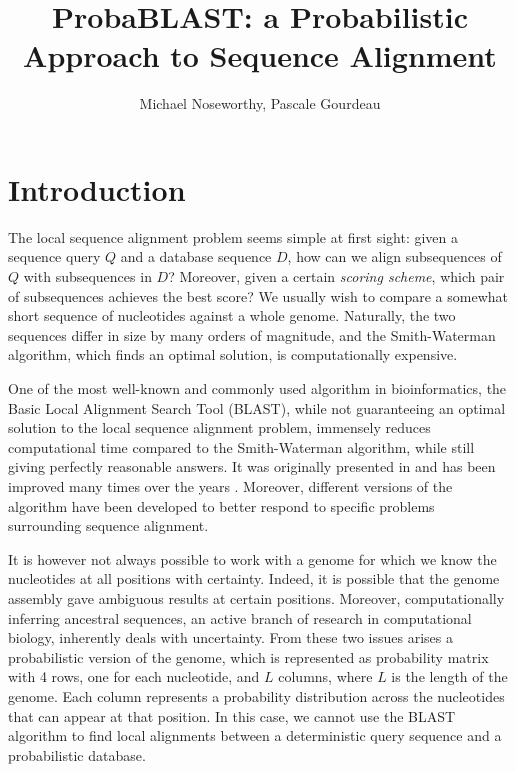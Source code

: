 \documentclass[11pt]{IEEEtran}
\begin{document}
\title{ProbaBLAST: a Probabilistic Approach to Sequence Alignment}
\author{Michael Noseworthy, Pascale Gourdeau}
\date{}
\maketitle

\section{Introduction}

The local sequence alignment problem seems simple at first sight: given a sequence query $Q$ and a database sequence $D$, how can we align subsequences of $Q$ with subsequences in $D$? Moreover, given a certain \emph{scoring scheme}, which pair of subsequences achieves the best score? We usually wish to compare a somewhat short sequence of nucleotides against a whole genome. Naturally, the two sequences differ in size by many orders of magnitude, and the Smith-Waterman algorithm, which finds an optimal solution, is computationally expensive. 

One of the most well-known and commonly used algorithm in bioinformatics, the Basic Local Alignment Search Tool (BLAST), while not guaranteeing an optimal solution to the local sequence alignment problem, immensely reduces computational time compared to the Smith-Waterman algorithm, while still giving perfectly reasonable answers. It was originally presented in \cite{originalBLAST} and has been improved many times over the years \cite{blast2}. Moreover, different versions of the algorithm have been developed to better respond to specific problems surrounding sequence alignment. 

It is however not always possible to work with a genome for which we know the nucleotides at all positions with certainty. Indeed, it is possible that the genome assembly gave ambiguous results at certain positions. Moreover, computationally inferring ancestral sequences, an active branch of research in computational biology, inherently deals with uncertainty. From these two issues arises a probabilistic version of the genome, which is represented as probability matrix with 4 rows, one for each nucleotide, and $L$ columns, where $L$ is the length of the genome. Each column represents a probability distribution across the nucleotides that can appear at that position. In this case, we cannot use the BLAST algorithm to find local alignments between a deterministic query sequence and a probabilistic database.
\end{document}

